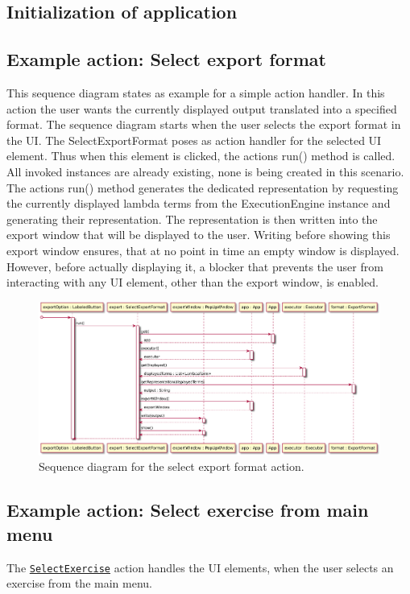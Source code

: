 \subsection{Initialization of application}

\subsection{Example action: Select export format}
This sequence diagram states as example for a simple action handler.
In this action the user wants the currently displayed output translated into a specified format. The sequence diagram starts when the user selects the export format in the UI. 
The SelectExportFormat poses as action handler for the selected UI element. Thus when this element is clicked, the actions run() method is called. All invoked instances are already existing, none is being created in this scenario.
The actions run() method generates the dedicated representation by requesting the currently displayed lambda terms from the ExecutionEngine instance and generating their representation.
The representation is then written into the export window that will be displayed to the user. Writing before showing this export window ensures, that at no point in time an empty window is displayed.
However, before actually displaying it, a blocker that prevents the user from interacting with any UI element, other than the export window, is enabled.

\begin{figure}[H]
	\centering
	\includegraphics[width=\textwidth]{sequenceDiagrams/exportOutput}
	\caption{Sequence diagram for the select export format action.}
\end{figure}

\subsection{Example action: Select exercise from main menu}
The \texttt{\hyperref[type:edu.kit.wavelength.client.view.action.SelectExercise]{SelectExercise}} 
action handles the UI elements, when the user selects an exercise from the main menu.

